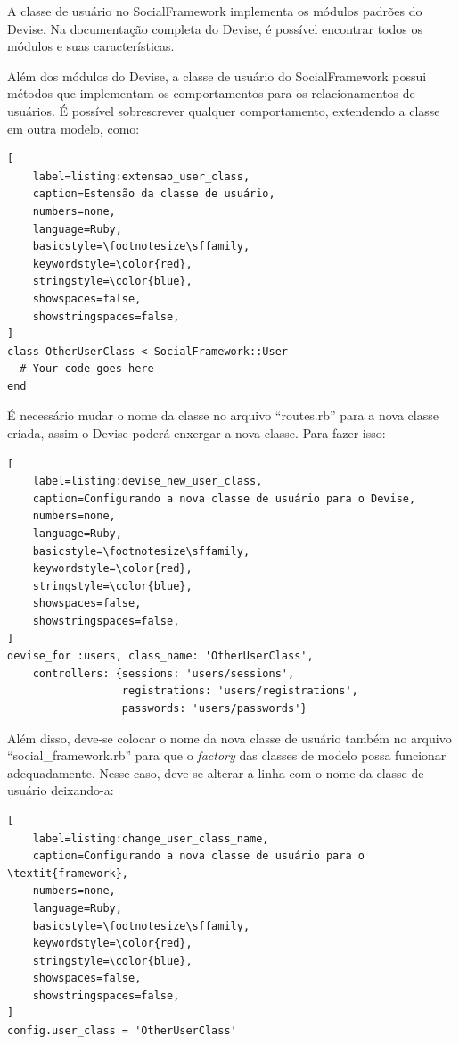 A classe de usuário no SocialFramework implementa os módulos padrões do Devise. Na documentação completa do Devise, é possível encontrar todos os módulos e suas características.

Além dos módulos do Devise, a classe de usuário do SocialFramework possui métodos que implementam os comportamentos para os relacionamentos de usuários. É possível sobrescrever qualquer comportamento, extendendo a classe em outra modelo, como:

\begin{lstlisting}[
    label=listing:extensao_user_class,
    caption=Estensão da classe de usuário,
    numbers=none,
    language=Ruby,
    basicstyle=\footnotesize\sffamily,
    keywordstyle=\color{red},
    stringstyle=\color{blue},
    showspaces=false,
    showstringspaces=false,
]
class OtherUserClass < SocialFramework::User
  # Your code goes here
end
\end{lstlisting}

É necessário mudar o nome da classe no arquivo ``routes.rb'' para a nova classe criada, assim o Devise poderá enxergar a nova classe. Para fazer isso:

\begin{lstlisting}[
    label=listing:devise_new_user_class,
    caption=Configurando a nova classe de usuário para o Devise,
    numbers=none,
    language=Ruby,
    basicstyle=\footnotesize\sffamily,
    keywordstyle=\color{red},
    stringstyle=\color{blue},
    showspaces=false,
    showstringspaces=false,
]
devise_for :users, class_name: 'OtherUserClass',
    controllers: {sessions: 'users/sessions',
                  registrations: 'users/registrations',
                  passwords: 'users/passwords'}
\end{lstlisting}

Além disso, deve-se colocar o nome da nova classe de usuário também no arquivo ``social\_framework.rb'' para que o \textit{factory} das classes de modelo possa funcionar adequadamente. Nesse caso, deve-se alterar a linha com o nome da classe de usuário deixando-a:

\begin{lstlisting}[
    label=listing:change_user_class_name,
    caption=Configurando a nova classe de usuário para o \textit{framework},
    numbers=none,
    language=Ruby,
    basicstyle=\footnotesize\sffamily,
    keywordstyle=\color{red},
    stringstyle=\color{blue},
    showspaces=false,
    showstringspaces=false,
]
config.user_class = 'OtherUserClass'
\end{lstlisting}

